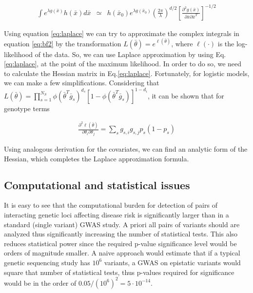 \begin{eqnarray}\label{eq:laplace}
	\int{e^{\lambda g(\bar{x})} h(\bar{x}) d\bar{x}} & \simeq & h(\bar{x}_0) e^{\lambda g(\bar{x}_0)} 
	\left( \frac{2 \pi}{\lambda} \right)^{d/2} \left[ \frac{\partial^2 g(\bar{x}) }{\partial \bar{x} \partial \bar{x}^T} \right] ^{-1/2}
\end{eqnarray}

Using equation \ref{eq:laplace} we can try to approximate the complex integrals in equation \ref{eq:bf2} by the transformation $L(\bar{\theta}) = e^{\ell(\bar{\theta})}$, where $\ell(\cdot)$ is the log-likelihood of the data. So, we can use Laplace approximation by using Eq.\ref{eq:laplace}, at the point of the maximum likelihood. In order to do so, we need to calculate the Hessian matrix in Eq.\ref{eq:laplace}. Fortunately, for logistic models, we can make a few simplifications. Considering that $L(\bar{\theta}) = \prod_{s=1}^{N_S}{ \phi( \bar{\theta}^T \bar{g}_s)^{d_s} [ 1-\phi( \bar{\theta}^T \bar{g}_s) ]^{1-d_i} }$, it can be shown that for genotype terms

\begin{eqnarray*}
	\frac{ \partial^2 \ell(\bar{\theta}) }{ \partial\theta_i \partial\theta_j } 
	= \sum_s{ g_{s,i} g_{s,j} p_s (1-p_s) } 
\end{eqnarray*}

Using analogous derivation for the covariates, we can find an analytic form of the Hessian, which completes the Laplace approximation formula.

\subsection{Computational and statistical issues}

It is easy to see that the computational burden for detection of pairs of interacting genetic loci affecting disease risk is significantly larger than in a standard (single variant) GWAS study. A priori all pairs of variants should are analyzed thus significantly increasing the number of statistical tests. This also reduces statistical power since the required p-value significance level would be orders of magnitude smaller. A naive approach would estimate that if a typical genetic sequencing study has $10^6$ variants, a GWAS on epistatic variants would square that number of statistical tests, thus p-values required for significance would be in the order of $0.05 / (10^6)^2 = 5 \cdot 10^{-14}$. 

